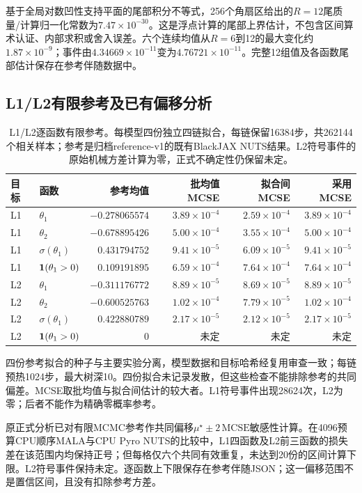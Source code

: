 基于全局对数凹性支持平面的尾部积分不等式，256个角扇区给出的$R=12$尾质量/计算归一化常数为$7.47\times10^{-30}$。这是浮点计算的尾部上界估计，不包含区间算术认证、内部求积或舍入误差。六个连续均值从$R=6$到12的最大变化约$1.87\times10^{-9}$；事件由$4.34669\times10^{-11}$变为$4.76721\times10^{-11}$。完整12组值及各函数尾部估计保存在参考伴随数据中。

\subsection{L1/L2有限参考及已有偏移分析}
\begin{table}[htbp]\centering\small
\begin{tabular}{llrrrr}\toprule
目标 & 函数 & 参考均值 & 批均值MCSE & 拟合间MCSE & 采用MCSE\\\midrule
L1 & $\theta_1$ & $-0.278065574$ & $3.89\times10^{-4}$ & $2.59\times10^{-4}$ & $3.89\times10^{-4}$\\
L1 & $\theta_2$ & $-0.678895426$ & $5.00\times10^{-4}$ & $3.55\times10^{-4}$ & $5.00\times10^{-4}$\\
L1 & $\sigma(\theta_1)$ & $0.431794752$ & $9.41\times10^{-5}$ & $6.09\times10^{-5}$ & $9.41\times10^{-5}$\\
L1 & $\mathbf{1}(\theta_1>0)$ & $0.109191895$ & $6.59\times10^{-4}$ & $7.64\times10^{-4}$ & $7.64\times10^{-4}$\\
L2 & $\theta_1$ & $-0.311176772$ & $8.89\times10^{-5}$ & $8.69\times10^{-5}$ & $8.89\times10^{-5}$\\
L2 & $\theta_2$ & $-0.600525763$ & $1.02\times10^{-4}$ & $7.79\times10^{-5}$ & $1.02\times10^{-4}$\\
L2 & $\sigma(\theta_1)$ & $0.422880789$ & $2.17\times10^{-5}$ & $2.12\times10^{-5}$ & $2.17\times10^{-5}$\\
L2 & $\mathbf{1}(\theta_1>0)$ & $0$ & 未定 & 未定 & 未定\\
\bottomrule\end{tabular}
\caption{L1/L2逐函数有限参考。每模型四份独立四链拟合，每链保留16384步，共262144个相关样本；参考是归档reference-v1的既有BlackJAX NUTS结果。L2符号事件的原始机械方差计算为零，正式不确定性仍保留未定。}
\label{tab:reference-logistic}
\end{table}
四份参考拟合的种子与主要实验分离，模型数据和目标哈希经复用审查一致；每链预热1024步，最大树深10。四份拟合未记录发散，但这些检查不能排除参考的共同偏差。MCSE取批均值与拟合间估计的较大者。L1符号事件出现28624次，L2为零；后者不能作为精确零概率参考。

原正式分析已对有限MCMC参考作共同偏移$\mu^\star\pm2\,\mathrm{MCSE}$敏感性计算。在4096预算CPU顺序MALA与CPU Pyro NUTS的比较中，L1四函数及L2前三函数的损失差在该范围内均保持正号；但每格仅六个共同有效重复，未达到20份的区间计算下限。L2符号事件保持未定。逐函数上下限保存在参考伴随JSON；这一偏移范围不是置信区间，且没有扣除参考方差。

